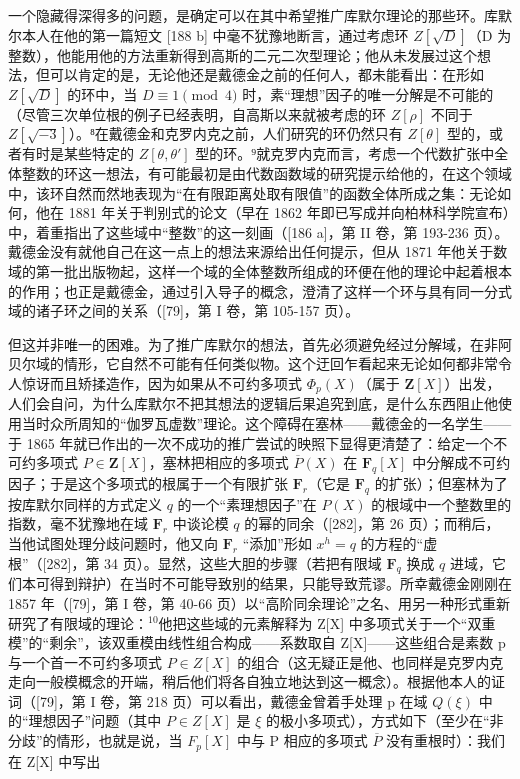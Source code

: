 一个隐藏得深得多的问题，是确定可以在其中希望推广库默尔理论的那些环。库默尔本人在他的第一篇短文 {[}188 b{]} 中毫不犹豫地断言，通过考虑环 \(Z[\sqrt{D}]\)（D 为整数），他能用他的方法重新得到高斯的二元二次型理论；他从未发展过这个想法，但可以肯定的是，无论他还是戴德金之前的任何人，都未能看出：在形如 \(Z[\sqrt{D}]\) 的环中，当 \(D \equiv 1 \pmod{4}\) 时，素“理想”因子的唯一分解是不可能的（尽管三次单位根的例子已经表明，自高斯以来就被考虑的环 \(Z[\rho]\) 不同于 \(Z[\sqrt{-3}]\)）。⁸在戴德金和克罗内克之前，人们研究的环仍然只有 \(Z[\theta]\) 型的，或者有时是某些特定的 \(Z[\theta, \theta']\) 型的环。⁹就克罗内克而言，考虑一个代数扩张中全体整数的环这一想法，有可能最初是由代数函数域的研究提示给他的，在这个领域中，该环自然而然地表现为“在有限距离处取有限值”的函数全体所成之集：无论如何，他在 1881 年关于判别式的论文（早在 1862 年即已写成并向柏林科学院宣布）中，着重指出了这些域中“整数”的这一刻画（{[}186 a{]}，第 II 卷，第 193-236 页）。戴德金没有就他自己在这一点上的想法来源给出任何提示，但从 1871 年他关于数域的第一批出版物起，这样一个域的全体整数所组成的环便在他的理论中起着根本的作用；也正是戴德金，通过引入导子的概念，澄清了这样一个环与具有同一分式域的诸子环之间的关系（{[}79{]}，第 I 卷，第 105-157 页）。

但这并非唯一的困难。为了推广库默尔的想法，首先必须避免经过分解域，在非阿贝尔域的情形，它自然不可能有任何类似物。这个迂回乍看起来无论如何都非常令人惊讶而且矫揉造作，因为如果从不可约多项式 \(\Phi_p(X)\)（属于 \(\mathbf{Z}[X]\)）出发，人们会自问，为什么库默尔不把其想法的逻辑后果追究到底，是什么东西阻止他使用当时众所周知的“伽罗瓦虚数”理论。这个障碍在塞林——戴德金的一名学生——于 1865 年就已作出的一次不成功的推广尝试的映照下显得更清楚了：给定一个不可约多项式 \(P \in \mathbf{Z}[X]\)，塞林把相应的多项式 \(\overline{P}(X)\) 在 \(\mathbf{F}_q[X]\) 中分解成不可约因子；于是这个多项式的根属于一个有限扩张 \(\mathbf{F}_r\)（它是 \(\mathbf{F}_q\) 的扩张）；但塞林为了按库默尔同样的方式定义 \(q\) 的一个“素理想因子”在 \(P(X)\) 的根域中一个整数里的指数，毫不犹豫地在域 \(\mathbf{F}_r\) 中谈论模 \(q\) 的幂的同余（{[}282{]}，第 26 页）；而稍后，当他试图处理分歧问题时，他又向 \(\mathbf{F}_r\) “添加”形如 \(x^h = q\) 的方程的“虚根”（{[}282{]}，第 34 页）。显然，这些大胆的步骤（若把有限域 \(\mathbf{F}_q\) 换成 \(q\) 进域，它们本可得到辩护）在当时不可能导致别的结果，只能导致荒谬。所幸戴德金刚刚在 1857 年（{[}79{]}，第 I 卷，第 40-66 页）以“高阶同余理论”之名、用另一种形式重新研究了有限域的理论：\(^{10}\)他把这些域的元素解释为 Z{[}X{]} 中多项式关于一个“双重模”的“剩余”，该双重模由线性组合构成——系数取自 Z{[}X{]}——这些组合是素数 p 与一个首一不可约多项式 \(P \in Z[X]\) 的组合（这无疑正是他、也同样是克罗内克走向一般模概念的开端，稍后他们将各自独立地达到这一概念）。根据他本人的证词（{[}79{]}，第 I 卷，第 218 页）可以看出，戴德金曾着手处理 p 在域 \(Q(\xi)\) 中的“理想因子”问题（其中 \(P \in Z[X]\) 是 \(\xi\) 的极小多项式），方式如下（至少在“非分歧”的情形，也就是说，当 \(F_p[X]\) 中与 P 相应的多项式 \(\overline{P}\) 没有重根时）：我们在 Z{[}X{]} 中写出

